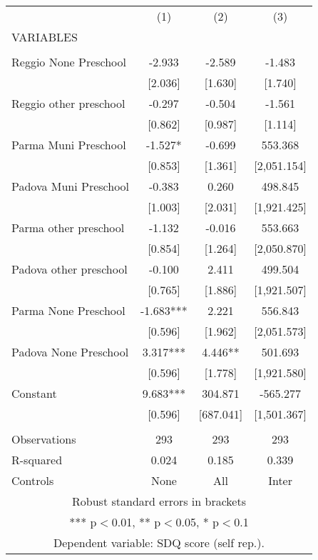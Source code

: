 \begin{tabular}{lccc} \hline
 & (1) & (2) & (3) \\
VARIABLES &  &  &  \\ \hline
 &  &  &  \\
Reggio None Preschool & -2.933 & -2.589 & -1.483 \\
 & [2.036] & [1.630] & [1.740] \\
Reggio other preschool & -0.297 & -0.504 & -1.561 \\
 & [0.862] & [0.987] & [1.114] \\
Parma Muni Preschool & -1.527* & -0.699 & 553.368 \\
 & [0.853] & [1.361] & [2,051.154] \\
Padova Muni Preschool & -0.383 & 0.260 & 498.845 \\
 & [1.003] & [2.031] & [1,921.425] \\
Parma other preschool & -1.132 & -0.016 & 553.663 \\
 & [0.854] & [1.264] & [2,050.870] \\
Padova other preschool & -0.100 & 2.411 & 499.504 \\
 & [0.765] & [1.886] & [1,921.507] \\
Parma None Preschool & -1.683*** & 2.221 & 556.843 \\
 & [0.596] & [1.962] & [2,051.573] \\
Padova None Preschool & 3.317*** & 4.446** & 501.693 \\
 & [0.596] & [1.778] & [1,921.580] \\
Constant & 9.683*** & 304.871 & -565.277 \\
 & [0.596] & [687.041] & [1,501.367] \\
 &  &  &  \\
Observations & 293 & 293 & 293 \\
R-squared & 0.024 & 0.185 & 0.339 \\
 Controls & None & All & Inter \\ \hline
\multicolumn{4}{c}{ Robust standard errors in brackets} \\
\multicolumn{4}{c}{ *** p$<$0.01, ** p$<$0.05, * p$<$0.1} \\
\multicolumn{4}{c}{ Dependent variable: SDQ score (self rep.).} \\
\end{tabular}
